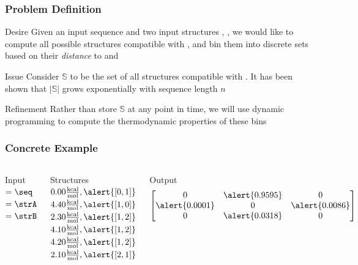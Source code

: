\documentclass{beamer}
\begin{document}
\begin{frame}
  \frametitle{Problem Definition}
  \begin{block}{Desire}
  Given an input sequence \seq and two input structures \strA, \strB, we would like to compute \alert{all} possible structures \strS compatible with \seq, and bin them into discrete sets based on their {\em distance} to \strA and \strB
  \end{block}

  \begin{alertblock}{Issue}
  Consider $\mathbb{S}$ to be the set of all structures compatible with \seq. It has been shown that $|\mathbb{S}|$ grows exponentially with sequence length $n$
  \end{alertblock}

  \begin{block}{Refinement}
  Rather than store $\mathbb{S}$ at any point in time, we will use dynamic programming to compute the thermodynamic properties of these bins
  \end{block}
\end{frame}

\begin{frame}[fragile]
  \frametitle{Concrete Example}
  \begin{columns}[t]
  \begin{block}{Input}
  \vspace{1em}
   $= \seq$  \\
   $= \strA$ \\
   $= \strB$
  \end{block}

  \begin{block}{Structures}
  \vspace{1em}
  \;$0.00 \frac{\text{kcal}}{\text{mol}}, \alert{[0, 1]}$
  \;$4.40 \frac{\text{kcal}}{\text{mol}}, \alert{[1, 0]}$
  \;$2.30 \frac{\text{kcal}}{\text{mol}}, \alert{[1, 2]}$
  \;$4.10 \frac{\text{kcal}}{\text{mol}}, \alert{[1, 2]}$
  \;$4.20 \frac{\text{kcal}}{\text{mol}}, \alert{[1, 2]}$
  \;$2.10 \frac{\text{kcal}}{\text{mol}}, \alert{[2, 1]}$
  \end{block}

  \begin{block}{Output}
  \begin{align*}
  \begin{bmatrix}
  0 & \alert{0.9595} & 0 \\
  \alert{0.0001} & 0 & \alert{0.0086} \\
  0 & \alert{0.0318} & 0
  \end{bmatrix}
  \end{align*}
  \end{block}
  \end{columns}
\end{frame}
\end{document}
